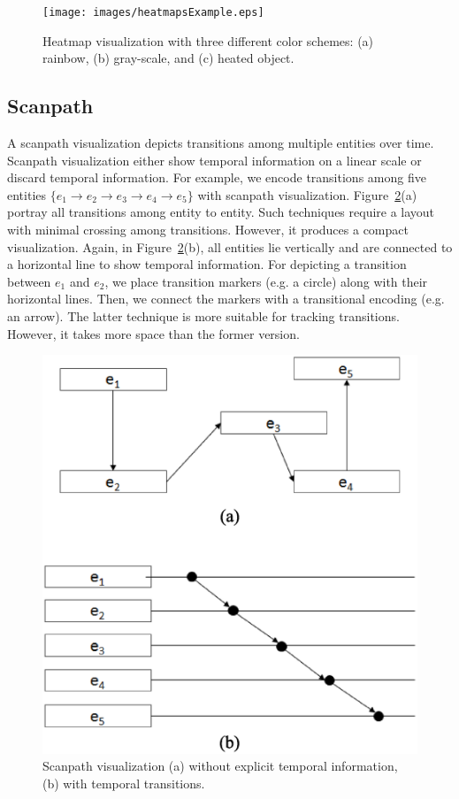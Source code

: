 \begin{figure}[htbp]
  \centering
  \texttt{[image: images/heatmapsExample.eps]}
  \caption{Heatmap visualization with three different color schemes: (a) rainbow, (b) gray-scale, and (c) heated object.}
	\label{fig:heatmapsExample}
\end{figure}



\subsection{Scanpath}
A scanpath visualization depicts transitions among multiple entities over time. Scanpath visualization either show temporal information on a linear scale or discard temporal information. For example, we encode transitions among five entities $\{e_1 \rightarrow e_2\rightarrow e_3\rightarrow e_4\rightarrow e_5\}$ with scanpath visualization. Figure~\ref{fig:scanpathExample}(a) portray all transitions among entity to entity. Such techniques require a layout with minimal crossing among transitions. However, it produces a compact visualization. Again, in Figure~\ref{fig:scanpathExample}(b), all entities lie vertically and are connected to a horizontal line to show temporal information. For depicting a transition between $e_1$ and $e_2$, we place transition markers (e.g. a circle) along with their horizontal lines. Then, we connect the markers with a transitional encoding (e.g. an arrow). The latter technique is more suitable for tracking transitions. However, it takes more space than the former version. 

\begin{figure}[htbp]
  \centering
  \includegraphics[width=\linewidth]{images/scanpathExample.eps}
  \caption{Scanpath visualization (a) without explicit temporal information, (b) with temporal transitions.}
	\label{fig:scanpathExample}
\end{figure}

